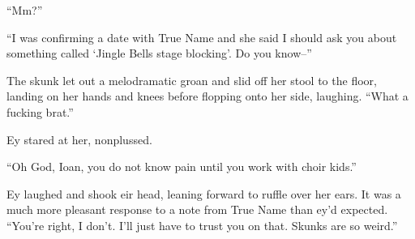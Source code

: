 ``Mm?''

``I was confirming a date with True Name and she said I should ask you about something called `Jingle Bells stage blocking'. Do you know--''

The skunk let out a melodramatic groan and slid off her stool to the floor, landing on her hands and knees before flopping onto her side, laughing. ``What a fucking brat.''

Ey stared at her, nonplussed.

``Oh God, Ioan, you do not know pain until you work with choir kids.''

Ey laughed and shook eir head, leaning forward to ruffle over her ears. It was a much more pleasant response to a note from True Name than ey'd expected. ``You're right, I don't. I'll just have to trust you on that. Skunks are so weird.''
